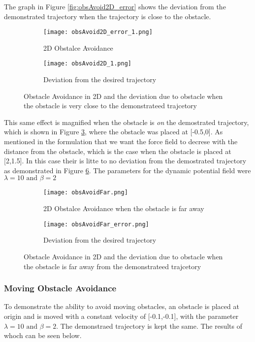 The graph in Figure \ref{fig:obsAvoid2D_error} shows the deviation from the demonstrated trajectory when the trajectory is close to the obstacle. 
\begin{figure}[!htp]
    \centering
    \begin{subfigure}{0.5\textwidth}
        \texttt{[image: obsAvoid2D\_error\_1.png]}
        \caption{2D Obstalce Avoidance}
        \label{fig:obsAvoid2D_1}
    \end{subfigure}%
    \begin{subfigure}{0.5\textwidth}
        \centering
        \texttt{[image: obsAvoid2D\_1.png]}
        \caption{Deviation from the desired trajectory}
        \label{fig:obsAvoid2D_error_1}
    \end{subfigure}
    \caption{Obstacle Avoidance in 2D and the deviation due to obstacle when the obstacle is very close to the demonstrateed trajcetory}
    \label{fig:obsAvoid2D_ontraj}
\end{figure}


This same effect is magnified when the obstacle is \textit{on} the demostrated trajectory, 
which is shown in Figure \ref{fig:obsAvoid2D_ontraj}, where
the obstacle was placed at [-0.5,0]. As mentioned in the formulation that we want the force field to decrese with the distance from the obstacle, which
is the case when the obstacle is placed at [2,1.5]. In this case their is litte to no deviation from the demostrated trajectory
as demonstrated in Figure \ref{fig:obsAvoid2Dfar}. The parameters for the dynamic potential field were $\lambda = 10 \text{ and } \beta = 2$
\begin{figure}[!htp]
    \centering
    \begin{subfigure}{0.5\textwidth}
        \texttt{[image: obsAvoidFar.png]}
        \caption{2D Obstalce Avoidance when the obstacle is far away}
        \label{fig:obsAvoid2D_far}
    \end{subfigure}%
    \begin{subfigure}{0.5\textwidth}
        \centering
        \texttt{[image: obsAvoidFar\_error.png]}
        \caption{Deviation from the desired trajectory}
        \label{fig:obsAvoid2D_error_far}
    \end{subfigure}
    \caption{Obstacle Avoidance in 2D and the deviation due to obstacle when the obstacle is far away from the demonstrateed trajcetory}
    \label{fig:obsAvoid2Dfar}
\end{figure}
\subsubsection{Moving Obstacle Avoidance}
To demonstrate the ability to avoid moving obstacles, an obstacle is placed at origin and is moved with a constant velocity of [-0.1,-0.1],
with the parameter $\lambda = 10 \text{ and } \beta = 2$. The demonstraed trajectory is kept the same. The results of whoch can be seen below.

